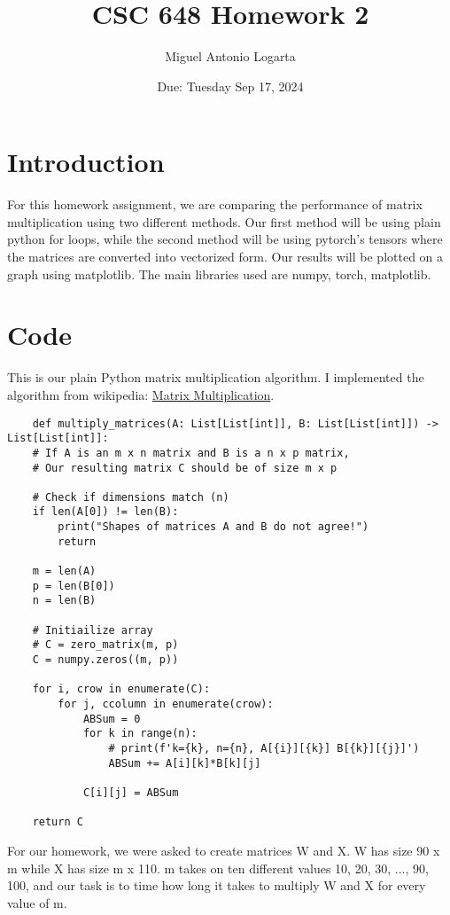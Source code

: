 \documentclass{article}
\title{CSC 648 Homework 2}
\date{Due: Tuesday Sep 17, 2024}
\author{Miguel Antonio Logarta}
\begin{document}
\maketitle  %

\section{Introduction}
For this homework assignment, we are comparing the performance of matrix multiplication using two different methods. Our first method will be using plain python for loops, while the second method will be using pytorch's tensors where the matrices are converted into vectorized form. Our results will be plotted on a graph using matplotlib. The main libraries used are numpy, torch, matplotlib.

\section{Code}
This is our plain Python matrix multiplication algorithm. I implemented the algorithm from wikipedia: 
\href{https://en.wikipedia.org/wiki/Matrix_multiplication}{Matrix Multiplication}.

\begin{lstlisting}
    def multiply_matrices(A: List[List[int]], B: List[List[int]]) -> List[List[int]]:
    # If A is an m x n matrix and B is a n x p matrix,
    # Our resulting matrix C should be of size m x p

    # Check if dimensions match (n)
    if len(A[0]) != len(B):
        print("Shapes of matrices A and B do not agree!")
        return
    
    m = len(A)
    p = len(B[0])
    n = len(B)

    # Initiailize array
    # C = zero_matrix(m, p)
    C = numpy.zeros((m, p))

    for i, crow in enumerate(C):
        for j, ccolumn in enumerate(crow):
            ABSum = 0
            for k in range(n):
                # print(f'k={k}, n={n}, A[{i}][{k}] B[{k}][{j}]')
                ABSum += A[i][k]*B[k][j]
            
            C[i][j] = ABSum

    return C
\end{lstlisting}

For our homework, we were asked to create matrices W and X. W has size 90 x m while X has size m x 110. m takes on ten different values {10, 20, 30, ..., 90, 100}, and our task is to time how long it takes to multiply W and X for every value of m.
\end{document}
